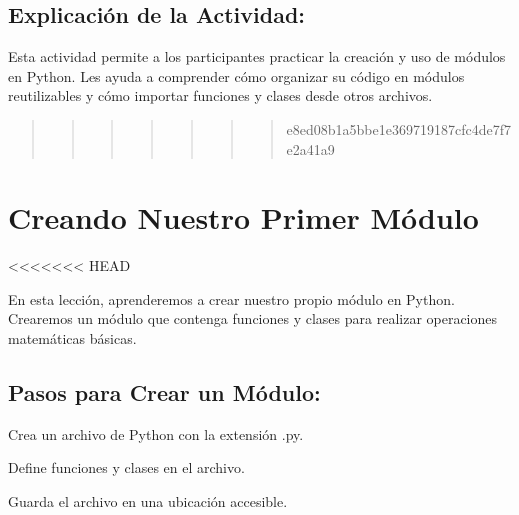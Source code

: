 \documentclass[
  a4paper,
  DIV=11,
  numbers=noendperiod,
  onepage,
  openany]{scrreprt}
\begin{document}
\hypertarget{explicaciuxf3n-de-la-actividad-57}{%
\section{Explicación de la
Actividad:}\label{explicaciuxf3n-de-la-actividad-57}}

Esta actividad permite a los participantes practicar la creación y uso
de módulos en Python. Les ayuda a comprender cómo organizar su código en
módulos reutilizables y cómo importar funciones y clases desde otros
archivos.

\begin{quote}
\begin{quote}
\begin{quote}
\begin{quote}
\begin{quote}
\begin{quote}
\begin{quote}
e8ed08b1a5bbe1e369719187cfc4de7f7e2a41a9
\end{quote}
\end{quote}
\end{quote}
\end{quote}
\end{quote}
\end{quote}
\end{quote}

\hypertarget{creando-nuestro-primer-muxf3dulo}{%
\chapter{Creando Nuestro Primer
Módulo}\label{creando-nuestro-primer-muxf3dulo}}

\textless\textless\textless\textless\textless\textless\textless{} HEAD

En esta lección, aprenderemos a crear nuestro propio módulo en Python.
Crearemos un módulo que contenga funciones y clases para realizar
operaciones matemáticas básicas.

\hypertarget{pasos-para-crear-un-muxf3dulo}{%
\section{Pasos para Crear un
Módulo:}\label{pasos-para-crear-un-muxf3dulo}}

Crea un archivo de Python con la extensión .py.

Define funciones y clases en el archivo.

Guarda el archivo en una ubicación accesible.
\end{document}
